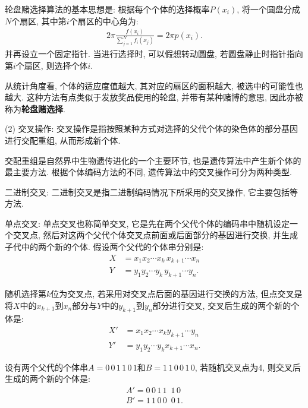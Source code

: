     \qquad {} 轮盘赌选择算法的基本思想是: 根据每个个体的选择概率$P(x_i)$, 将一个圆盘分成$N$个扇区, 其中第$i$个扇区的中心角为:
\begin{align}
    2 \pi \frac{f\left(x_{i}\right)}{\sum_{j=1}^{N} f_{i}\left(x_{j}\right)}=2 \pi p\left(x_{i}\right).
\end{align}
并再设立一个固定指针. 当进行选择时, 可以假想转动圆盘, 若圆盘静止时指针指向第$i$个扇区, 则选择个体$i$.

 从统计角度看, 个体的适应度值越大, 其对应的扇区的面积越大, 被选中的可能性也越大. 这种方法有点类似于发放奖品使用的轮盘, 并带有某种赌博的意思, 因此亦被称为\textbf{轮盘赌选择}.

(2) 交叉操作: 交叉操作是指按照某种方式对选择的父代个体的染色体的部分基因进行交配重组, 从而形成新个体.
\begin{remark}
    交配重组是自然界中生物遗传进化的一个主要环节, 也是遗传算法中产生新个体的最主要方法. 根据个体编码方法的不同, 遗传算法中的交叉操作可分为两种类型.
\end{remark}


     二进制交叉: 二进制交叉是指二进制编码情况下所采用的交叉操作, 它主要包括等方法.

     单点交叉: 单点交叉也称简单交叉, 它是先在两个父代个体的编码串中随机设定一个交叉点, 然后对这两个父代个体交叉点前面或后面部分的基因进行交换, 并生成子代中的两个新的个体. 假设两个父代的个体串分别是:
\begin{align*}
    X&=x_1 x_2 \cdots x_k\, x_{k+1} \cdots x_n\\
    Y&=y_1 y_2 \cdots y_k\,  y_{k+1} \cdots y_n.
\end{align*}

    随机选择第$k$位为交叉点, 若采用对交叉点后面的基因进行交换的方法, 但点交叉是将$X$中的$x_{k+1}$到$x_n$部分与$Y$中的$y_{k+1}$到$y_n$部分进行交叉, 交叉后生成的两个新的个体是:
\begin{align*}
    X'&= x_1 x_2 \cdots x_k y_{k+1} \cdots y_n\\
    Y'&= y_1 y_2 \cdots y_k x_{k+1} \cdots x_n.
\end{align*}
\begin{example}
    设有两个父代的个体串$A=0\, 0\,  1\,  1\,  0\,  1$和$B=1\,  1\,  0\,  0\,  1\,  0$, 若随机交叉点为4, 则交叉后生成的两个新的个体是:
\begin{align*}
    A'= 0\, 0\, 1\, 1\,\,\, 1\, 0\\
    B'= 1\, 1\, 0\, 0\,\,\, 0\, 1.
\end{align*}
\vspace{-0.5cm}
\end{example}


